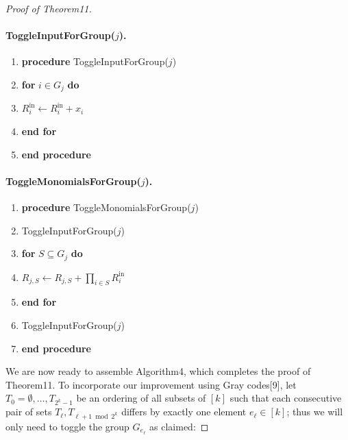 \begin{proof}[Proof of Theorem11]
\paragraph{ToggleInputForGroup($j$).}
\begin{enumerate}[label=\arabic*:]
\item \textbf{procedure} ToggleInputForGroup($j$)
\item \textbf{for} $i\in G_j$ \textbf{do}
\item $R_i^{\mathrm{in}}\leftarrow R_i^{\mathrm{in}}+x_i$
\item \textbf{end for}
\item \textbf{end procedure}
\end{enumerate}
\paragraph{ToggleMonomialsForGroup($j$).}
\begin{enumerate}[label=\arabic*:]
\item \textbf{procedure} ToggleMonomialsForGroup($j$)
\item ToggleInputForGroup($j$)
\item \textbf{for} $S\subseteq G_j$ \textbf{do}
\item $R_{j,S}\leftarrow R_{j,S}+\prod_{i\in S}R_i^{\mathrm{in}}$
\item \textbf{end for}
\item ToggleInputForGroup($j$)
\item \textbf{end procedure}
\end{enumerate}
We are now ready to assemble Algorithm4, which completes the proof of Theorem11. To incorporate our improvement using Gray codes[9], let $T_0=\emptyset,\ldots,T_{2^k-1}$ be an ordering of all subsets of $[k]$ such that each consecutive pair of sets $T_{\ell},T_{\ell+1\bmod2^k}$ differs by exactly one element $e_{\ell}\in[k]$; thus we will only need to toggle the group $G_{e_{\ell}}$ as claimed:

\end{proof}
